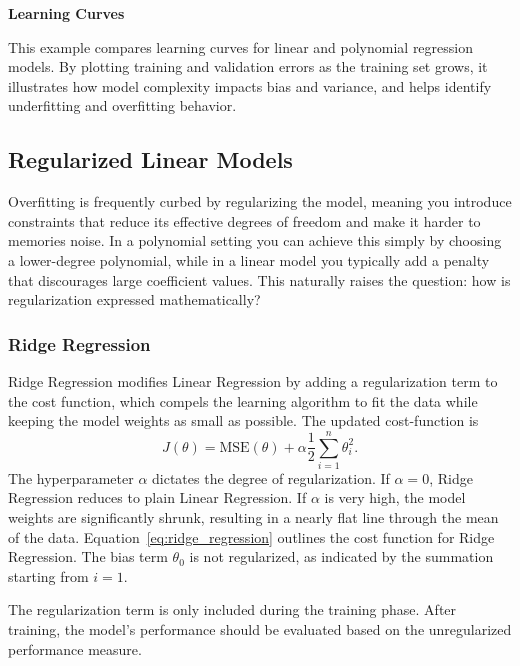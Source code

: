 \documentclass[12pt,letter]{article}
\begin{document}
\begin{example}
\textbf{Learning Curves}

\noindent This example compares learning curves for linear and polynomial regression models. By plotting training and validation errors as the training set grows, it illustrates how model complexity impacts bias and variance, and helps identify underfitting and overfitting behavior.
\end{example}




\subsection{Regularized Linear Models}
Overfitting is frequently curbed by regularizing the model, meaning you introduce constraints that reduce its effective degrees of freedom and make it harder to memories noise. In a polynomial setting you can achieve this simply by choosing a lower-degree polynomial, while in a linear model you typically add a penalty that discourages large coefficient values. This naturally raises the question: how is regularization expressed mathematically?


\subsubsection{Ridge Regression}




Ridge Regression modifies Linear Regression by adding a regularization term to the cost function, which compels the learning algorithm to fit the data while keeping the model weights as small as possible. The updated cost-function is
\begin{equation}
J(\theta) = \text{MSE}(\theta) + \alpha \frac{1}{2} \sum_{i=1}^{n} \theta_i^2.
\label{eq:ridge_regression}
\end{equation}
The hyperparameter $\alpha$ dictates the degree of regularization. If $\alpha = 0$, Ridge Regression reduces to plain Linear Regression. If $\alpha$ is very high, the model weights are significantly shrunk, resulting in a nearly flat line through the mean of the data. Equation~\ref{eq:ridge_regression} outlines the cost function for Ridge Regression. The bias term $\theta_0$ is not regularized, as indicated by the summation starting from $i = 1$.

\begin{mdframed}[middlelinewidth=0.5mm]
\begin{center}
\end{center}
The regularization term is only included during the training phase. After training, the model's performance should be evaluated based on the unregularized performance measure.
\end{mdframed}
\end{document}
